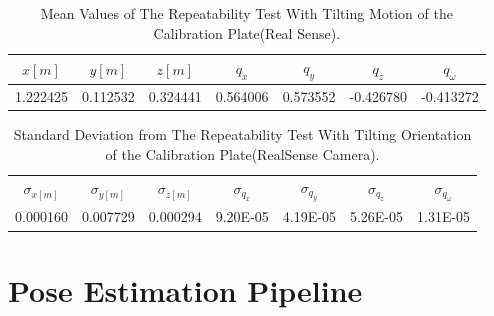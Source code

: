 \begin{table}[b]
\renewcommand{\arraystretch}{1.3}
\caption{Mean Values of The Repeatability Test With Tilting Motion of the Calibration Plate(Real Sense).}
\label{meanreal2}
\centering
\begin{tabular}{|c||c||c||c||c||c||c|}
\hline
$x[m]$ & $y[m]$ & $z[m]$ & $q_{x}$ & $q_{y}$ & $q_{z}$ &$q_{\omega}$ \\
\hline
1.222425&	0.112532&	0.324441&0.564006&	0.573552&	-0.426780&	-0.413272  \\
\hline
\hline
\end{tabular}
\end{table}


\begin{table}[b]
\renewcommand{\arraystretch}{1.3}
\caption{Standard Deviation from The Repeatability Test With Tilting Orientation of the Calibration Plate(RealSense Camera).}
\label{standardreal2}
\centering
\begin{tabular}{|c||c||c||c||c||c||c|}
\hline
$\sigma_{x[m]}$ & $\sigma_{y[m]}$ & $\sigma_{z[m]}$ & $\sigma_{q_{x}}$ & $\sigma_{q_{y}}$ & $\sigma_{q_{z}}$ &$\sigma_{q_{\omega}}$ \\
0.000160&	0.007729&	0.000294&9.20E-05&	4.19E-05&	5.26E-05&	1.31E-05\\
\hline
\hline
\end{tabular}
\end{table}



\section{Pose Estimation Pipeline}


